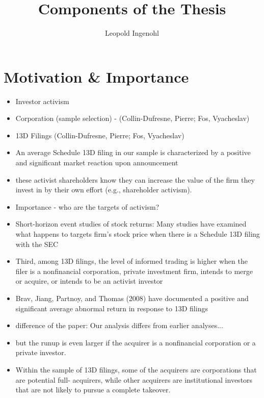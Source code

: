 \documentclass[12pt]{article}
\title{Components of the Thesis}
\author{Leopold Ingenohl}
\begin{document}
\maketitle


\section{Motivation \& Importance} 

    \begin{itemize}
        \item Investor activism 
        \item Corporation (sample selection) - (Collin-Dufresne, Pierre; Fos, Vyacheslav)
        \item 13D Filings (Collin-Dufresne, Pierre; Fos, Vyacheslav)
        \item An average Schedule 13D filing in our sample is characterized by a positive and significant market reaction upon announcement \citep{Collin-Dufresne2015}
        \item these activist shareholders know they can increase the value of the firm they invest in by their own effort (e.g., shareholder activism).\citep{Collin-Dufresne2015}
        \item Importance - who are the targets of activism? \citep{CoffeeJr.2014}
        \item Short-horizon event studies of stock returns: Many studies have examined what happens to targets firm’s stock price when there is a Schedule 13D filing with the SEC \citep{CoffeeJr.2014}
        \item Third, among 13D filings, the level of informed trading is higher when the filer is a nonfinancial corporation, private investment firm, intends to merge or acquire, or intends to be an activist investor \citep{Brigida2012}
        \item Brav, Jiang, Partnoy, and Thomas (2008) have documented a positive and significant average abnormal return in response to 13D filings \citep{Brigida2012}
        \item difference of the paper: Our analysis differs from earlier analyses...\citep{Brigida2012}
        \item but the runup is even larger if the acquirer is a nonfinancial corporation or a private investor.\citep{Brigida2012}
        \item Within the sample of 13D filings, some of the acquirers are corporations that are potential full-
        acquirers, while other acquirers are institutional investors that are not likely to pursue a complete takeover. \citep{Brigida2012}

\end{itemize}
\end{document}
